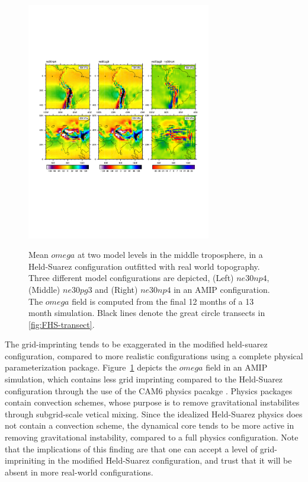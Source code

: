 \documentclass[twocol]{ametsoc}
\begin{document}
\begin{figure}[t]
\noindent\includegraphics[width=19pc,angle=0]{figs/FHS-contours-CROP.pdf}\\
\caption{Mean $omega$ at two model levels in the middle troposphere, in a Held-Suarez configuration outfitted with real world topography. Three different model configurations are depicted, (Left) $ne30np4$, (Middle) $ne30pg3$ and (Right) $ne30np4$ in an AMIP configuration. The $omega$ field is computed from the final 12 months of a 13 month simulation. Black lines denote the great circle transects in \ref{fig:FHS-transect}.}
\label{fig:FHS-contours}
\end{figure}


The grid-imprinting tends to be exaggerated in the modified held-suarez configuration, compared to more realistic configurations using a complete physical parameterization package. Figure~\ref{fig:FHS-contours} depicts the $omega$ field in an AMIP simulation, which contains less grid imprinting compared to the Held-Suarez configuration through the use of the CAM6 physics pacakge \citep{}. Physics packages contain convection schemes, whose purpose is to remove gravitational instabilites through subgrid-scale vetical mixing. Since the idealized Held-Suarez physics does not contain a convection scheme, the dynamical core tends to be more active in removing gravitational instability, compared to a full physics configuration. Note that the implications of this finding are that one can accept a level of grid-impriniting in the modified Held-Suarez configuration, and trust that it will be absent in more real-world configurations.
\end{document}
